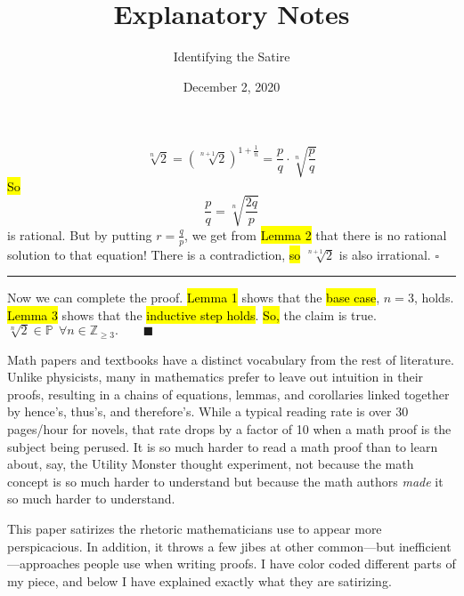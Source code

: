 \documentclass{article}
\begin{document}
	$$\sqrt[n]{2} = \left(\sqrt[n+1]{2}\right)^{1+\frac{1}{n}} = \frac{p}{q}\cdot \sqrt[n]{\frac{p}{q}}$$
	\hl{So}
	$$\frac{p}{q} = \sqrt[n]{\frac{2q}{p}}$$
	is rational. But by putting $r=\frac{q}{p}$, we get from \hl{Lemma 2} that there is no rational solution to that equation! There is a contradiction, \hl{so }$\sqrt[n+1]{2}$ is also irrational. $\square$
	\newline
	\hrule
	\vspace{5mm}
	\par
	Now we can complete the proof. \hl{Lemma 1} shows that the \hl{base case}, $n=3$, holds. \hl{Lemma 3} shows that the \hl{inductive step holds}. \hl{So,} the claim is true. \colorbox{lightviolet}{$\sqrt[n]{2}\in\mathbb{P}\ \ \forall n\in\mathbb{Z}_{\ge 3}.\qquad \blacksquare$}
	\newpage
	\title{Explanatory Notes}
	\author{Identifying the Satire}
	\date{December 2, 2020}
	\maketitle
	Math papers and textbooks have a distinct vocabulary from the rest of literature. Unlike physicists, many in mathematics prefer to leave out intuition in their proofs, resulting in a chains of equations, lemmas, and corollaries linked together by hence's, thus's, and therefore's. While a typical reading rate is over 30 pages/hour for novels, that rate drops by a factor of 10 when a math proof is the subject being perused. It is so much harder to read a math proof than to learn about, say, the Utility Monster thought experiment, not because the math concept is so much harder to understand but because the math authors \emph{made} it so much harder to understand.
	\par
	This paper satirizes the rhetoric mathematicians use to appear more perspicacious. In addition, it throws a few jibes at other common---but inefficient---approaches people use when writing proofs. I have color coded different parts of my piece, and below I have explained exactly what they are satirizing.
\end{document}
